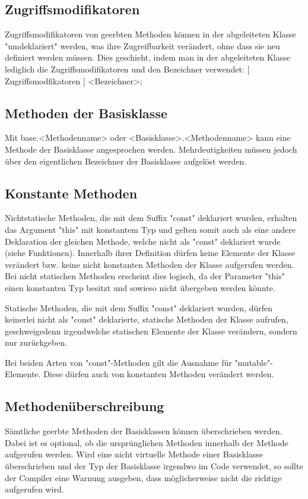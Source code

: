 \subsection{Zugriffsmodifikatoren}
Zugriffsmodifikatoren von geerbten Methoden können in der abgeleiteten Klasse "umdeklariert" werden, was ihre Zugreifbarkeit verändert,
ohne dass sie neu definiert werden müssen.
Dies geschieht, indem man in der abgeleiteten Klasse lediglich die Zugriffsmodifikatoren und den Bezeichner verwendet:
[ Zugriffsmodfikatoren ] <Bezeichner>;

\subsection{Methoden der Basisklasse}
Mit base.<Methodenname> oder <Basisklasse>.<Methodenname> kann eine Methode der Basisklasse angesprochen werden.
Mehrdeutigkeiten müssen jedoch über den eigentlichen Bezeichner der Basisklasse aufgelöst werden.

\subsection{Konstante Methoden}
Nichtstatische Methoden, die mit dem Suffix "const" deklariert wurden, erhalten das Argument "this" mit konstantem Typ
und gelten somit auch als eine andere Deklaration der gleichen Methode, welche nicht als "const"
deklariert wurde (siehe Funktionen).
Innerhalb ihrer Definition dürfen keine Elemente der Klasse verändert bzw. keine nicht konstanten Methoden der Klasse
aufgerufen werden. Bei nicht statischen Methoden erscheint dies logisch, da der Parameter "this" einen konstanten Typ besitzt
und sowieso nicht übergeben werden könnte.

Statische Methoden, die mit dem Suffix "const" deklariert wurden, dürfen keinerlei nicht als "const" deklarierte, statische
Methoden der Klasse aufrufen, geschweigedenn irgendwelche statischen Elemente der Klasse verändern, sondern nur zurückgeben.

Bei beiden Arten von "const"-Methoden gilt die Ausnahme für "mutable"-Elemente.
Diese dürfen auch von konstanten Methoden verändert werden.

\subsection{Methodenüberschreibung}
Sämtliche geerbte Methoden der Basisklassen können überschrieben werden. Dabei ist es optional, ob die ursprünglichen Methoden innerhalb
der Methode aufgerufen werden.
Wird eine nicht virtuelle Methode einer Basisklasse überschrieben und der Typ der Basisklasse irgendwo im Code verwendet, so sollte
der Compiler eine Warnung ausgeben, dass möglicherweise nicht die richtige aufgerufen wird.

